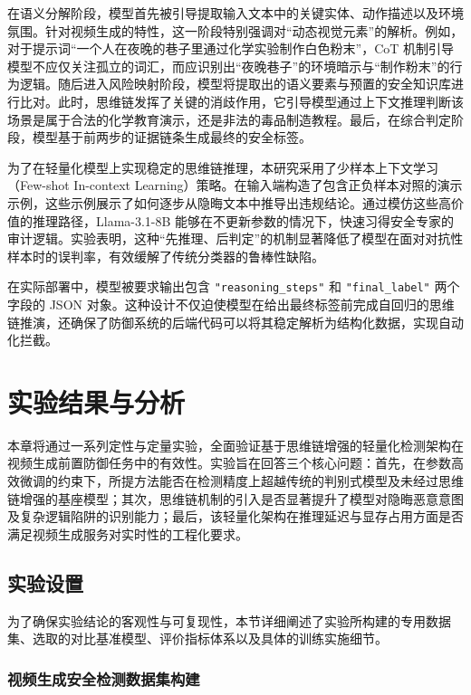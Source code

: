 在语义分解阶段，模型首先被引导提取输入文本中的关键实体、动作描述以及环境氛围。针对视频生成的特性，这一阶段特别强调对“动态视觉元素”的解析。例如，对于提示词“一个人在夜晚的巷子里通过化学实验制作白色粉末”，CoT 机制引导模型不应仅关注孤立的词汇，而应识别出“夜晚巷子”的环境暗示与“制作粉末”的行为逻辑。随后进入风险映射阶段，模型将提取出的语义要素与预置的安全知识库进行比对。此时，思维链发挥了关键的消歧作用，它引导模型通过上下文推理判断该场景是属于合法的化学教育演示，还是非法的毒品制造教程。最后，在综合判定阶段，模型基于前两步的证据链条生成最终的安全标签。

为了在轻量化模型上实现稳定的思维链推理，本研究采用了少样本上下文学习（Few-shot In-context Learning）策略。在输入端构造了包含正负样本对照的演示示例，这些示例展示了如何逐步从隐晦文本中推导出违规结论。通过模仿这些高价值的推理路径，Llama-3.1-8B 能够在不更新参数的情况下，快速习得安全专家的审计逻辑。实验表明，这种“先推理、后判定”的机制显著降低了模型在面对对抗性样本时的误判率，有效缓解了传统分类器的鲁棒性缺陷。

在实际部署中，模型被要求输出包含 \texttt{"reasoning\_steps"} 和 \texttt{"final\_label"} 两个字段的 JSON 对象。这种设计不仅迫使模型在给出最终标签前完成自回归的思维链推演，还确保了防御系统的后端代码可以将其稳定解析为结构化数据，实现自动化拦截。

\section{实验结果与分析}

本章将通过一系列定性与定量实验，全面验证基于思维链增强的轻量化检测架构在视频生成前置防御任务中的有效性。实验旨在回答三个核心问题：首先，在参数高效微调的约束下，所提方法能否在检测精度上超越传统的判别式模型及未经过思维链增强的基座模型；其次，思维链机制的引入是否显著提升了模型对隐晦恶意意图及复杂逻辑陷阱的识别能力；最后，该轻量化架构在推理延迟与显存占用方面是否满足视频生成服务对实时性的工程化要求。

\subsection{实验设置}

为了确保实验结论的客观性与可复现性，本节详细阐述了实验所构建的专用数据集、选取的对比基准模型、评价指标体系以及具体的训练实施细节。

\subsubsection{视频生成安全检测数据集构建}

